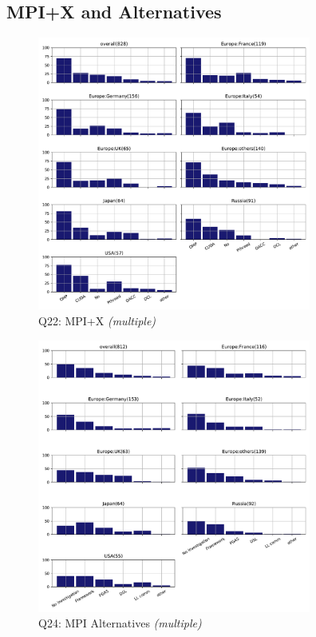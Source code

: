 \documentclass[conference,10pt,letterpaper]{IEEEtran}
\begin{document}
\subsection{MPI+X and Alternatives}

\begin{figure}[htb]
\begin{center}
\includegraphics[width=9cm]{Figs/Q22.pdf}
\caption{Q22: MPI+X {\it(multiple)}}
\label{fig:mpi-x}
\end{center}
\end{figure}

\begin{figure}[htb]
\begin{center}
\includegraphics[width=9cm]{Figs/Q24.pdf}
\caption{Q24: MPI Alternatives {\it(multiple)}}
\label{fig:mpi-altrenatives}
\end{center}
\end{figure}
  
\end{document}
